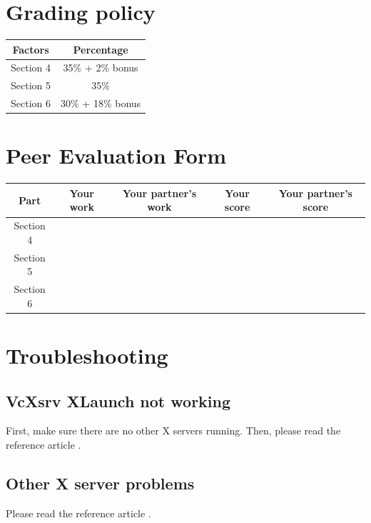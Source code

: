 \documentclass[a4paper,12pt,twoside]{article}
\begin{document}
\section{Grading policy}
\begin{table}[H]
    \centering
    \begin{tabular}{|c|c|}
        \hline
        Factors & Percentage \\
        \hline
        Section 4 & 35\% + 2\% bonus \\
        \hline
        Section 5 & 35\% \\
        \hline
        Section 6 & 30\% + 18\% bonus \\
        \hline
    \end{tabular}
\end{table}

\newpage
\appendix
\section{Peer Evaluation Form}
\begin{table}[H]
    \centering
    \begin{tabular}{|c|c|c|c|c|}
        \hline
        Part & Your work & Your partner's work & Your score & Your partner's score \\
        \hline
        Section 4 & & & & \\
        \hline
        Section 5 & & & & \\
        \hline
        Section 6 & & & & \\
        \hline
    \end{tabular}
\end{table}

\newpage
\section{Troubleshooting}\label{A1}
\subsection{VcXsrv XLaunch not working}\label{AXLaunch}
First, make sure there are no other X servers running. Then, please read the reference article \cite{xlaunchcsdn}.
\subsection{Other X server problems}
Please read the reference article \cite{cs252x11}.
\end{document}
